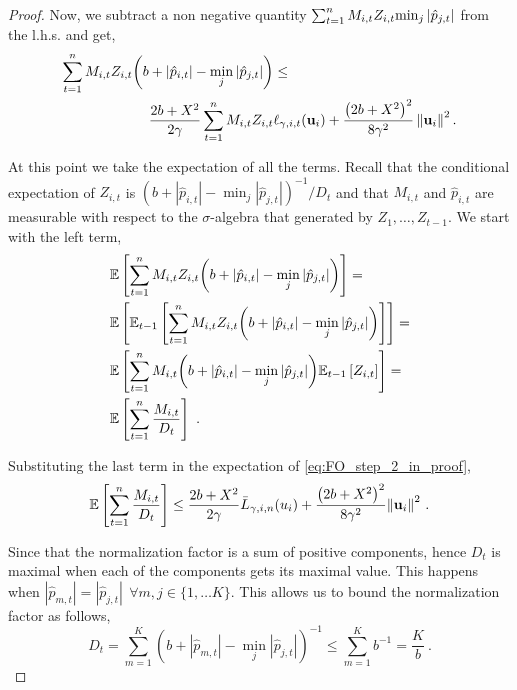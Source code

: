 {\begin{proof}
\noindent
Now, we subtract a non negative quantity $\sum_{t=1}^{n}M_{i,t}Z_{i,t}
{{\min_j{\left\vert{\hat{p}_{j,t}}\right\vert}}}$ from the l.h.s. and get,
\begin{equation}
\begin{split}
\sum_{t=1}^{n}M_{i,t}Z_{i,t}{\left({b +\left\vert{\hat{p}_{i,t}}\right\vert-\min_j{\left\vert{\hat{p}_{j,t}}\right\vert}}\right)}&\le\\
\frac{2b+X^2}{2\gamma}\sum_{t=1}^{n}{ M_{i,t}Z_{i,t}}&\ell_{\gamma,i,t}(\mathbf{u}_i)
+\frac{\left({2b+X^2}\right)^2}{8{\gamma}^2}\left\Vert {\mathbf{u}_i} \right\Vert^2.
\label{eq:FO_step_2_in_proof}
\end{split}
\end{equation}

\noindent
At this point we take  the expectation of all the terms. 
Recall that the conditional expectation of $Z_{i,t}$ is 
$(b+|\hat{p}_{i,t}|-\min_j| \hat{p}_{j,t}|)^{-1}/D_{t}$
and that $M_{i,t}$ and $\hat{p}_{i,t}$ are measurable with respect to the $\sigma$-algebra that generated by $Z_1,\ldots,Z_{t-1}$. 
We start with the left term,
\begin{align*}
\begin{split}
&\mathbb{E}\left[{\sum_{t=1}^{n}M_{i,t}Z_{i,t}{\left({{b
        +\left\vert{\hat{p}_{i,t}}\right\vert}-\min_{j}{\left\vert{ \hat{p}_{j,t}}\right\vert}}\right)}}\right]= \\
        &\mathbb{E}\left[{\mathbb{E}_{t-1}\left[{{\sum_{t=1}^{n}{M_{i,t}Z_{i,t}{\left({b +\left\vert{\hat{p}_{i,t}}\right\vert}-\min_{j}{\left\vert{\hat{p}_{j,t}}\right\vert}\right)}}}}\right]}\right]= \\
&\mathbb{E}\left[{{\sum_{t=1}^{n}M_{i,t}{\left({b +\left\vert{\hat{p}_{i,t}}\right\vert}-\min_{j}{\left\vert \hat{p}_{j,t} \right\vert}\right)}\mathbb{E}_{t-1}\left[{ Z_{i,t}}\right]}}\right]=\\
&\mathbb{E}\left[{\sum_{t=1}^{n}{\frac{M_{i,t}}{D_{t}}}}\right]~.
\end{split}
\end{align*}

\noindent
Substituting the last term in the expectation of
\eqref{eq:FO_step_2_in_proof}, %
\begin{equation}
\mathbb{E}\left[ \sum_{t=1}^{n}{\frac{M_{i,t}}{D_{t}}} \right]
\le \frac{2b+X^2}{2\gamma}{\bar
  L}_{\gamma,i,n}(u_i)+\frac{\left({2b+X^2}\right)^2}{8{\gamma}^2}{\left\Vert
    \mathbf{u}_{i} \right\Vert}^2~.
\label{eq:FO_step_3_in_proof}
\end{equation} 

\noindent
Since that the normalization factor is a sum of positive components,
hence $D_t$ is maximal when each of the components gets its maximal
value. This happens when $\left\vert \hat{p}_{m,t}
\right\vert=\left\vert \hat{p}_{j,t} \right\vert ~~  \forall
m,j \in\{1,\ldots K\}$. This allows us to bound the normalization factor as
follows,
\begin{equation*}
D_{t}=\sum_{m=1}^{K}{\left({b+\left\vert \hat{p}_{m,t}
      \right\vert-\min_{j}{\left\vert \hat{p}_{j,t}
        \right\vert}}\right)^{-1}} \le \sum_{m=1}^{K}{b^{-1}}=\frac{K}{b}~.
\end{equation*}



\end{proof}}

